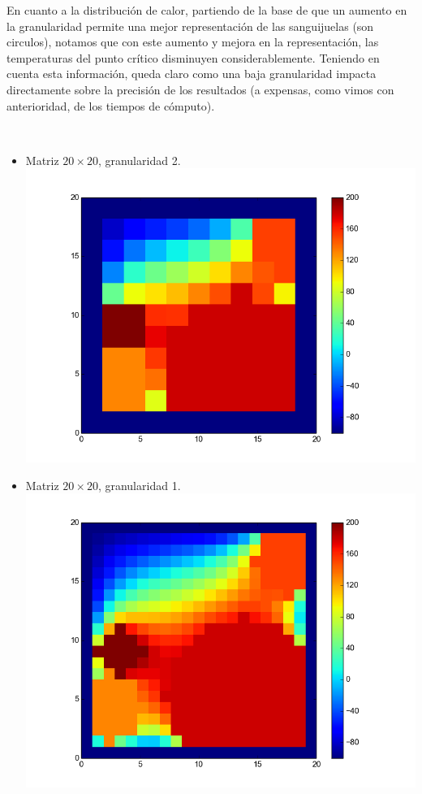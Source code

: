 En cuanto a la distribuci\'on de calor, partiendo de la base de que un aumento en la granularidad permite una mejor representaci\'on de las sanguijuelas (son circulos), notamos que con este aumento y mejora en la representaci\'on, las temperaturas del punto cr\'itico disminuyen considerablemente. Teniendo en cuenta esta informaci\'on, queda claro como una baja granularidad impacta directamente sobre la precisi\'on de los resultados (a expensas, como vimos con anterioridad, de los tiempos de c\'omputo).

\\
\begin{itemize}
 \item Matriz $20 \times 20$, granularidad 2.\\
  \includegraphics[width=400pt]{imagenes/imagen11.png}

 \item Matriz $20 \times 20$, granularidad 1.\\
  \includegraphics[width=400pt]{imagenes/imagen21.png}


\end{itemize}
